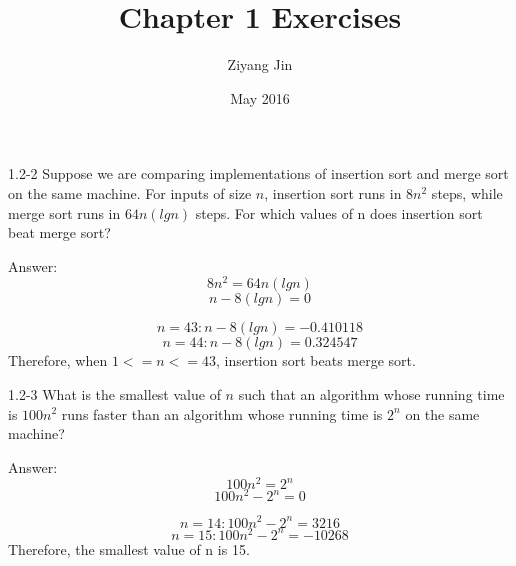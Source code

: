 \documentclass{article}
\title{Chapter 1 Exercises}
\author{Ziyang Jin}
\date{May 2016}
\begin{document}
1.2-2
Suppose we are comparing implementations of insertion sort and merge sort on the same machine. For inputs of size $n$, insertion sort runs in $8n^2$ steps, while merge sort runs in $64n(lg n)$ steps. For which values of n does insertion sort beat merge sort?

Answer:
  $$ 8n^2 = 64n (lg n) $$
  $$ n - 8(lgn) = 0 $$
  
  $$ n = 43:  n - 8(lg n) = -0.410118 $$
  $$ n = 44:  n - 8(lg n) =  0.324547 $$
  Therefore, when $1 <= n <= 43$, insertion sort beats merge sort.\par

1.2-3
What is the smallest value of $n$ such that an algorithm whose running time is $100n^2$ runs faster than an algorithm whose running time is $2^n$ on the same machine?

Answer:
  $$ 100n^2 = 2^n $$
  $$ 100n^2 - 2^n = 0 $$
  
  $$ n = 14: 100n^2 - 2^n = 3216 $$
  $$ n = 15: 100n^2 - 2^n = -10268 $$
  Therefore, the smallest value of n is 15.
\end{document}
